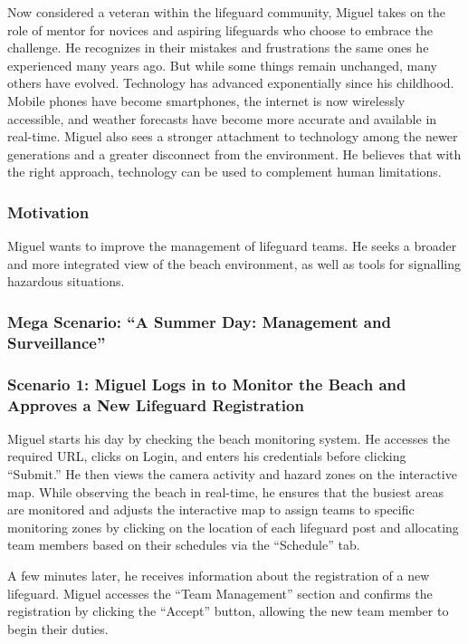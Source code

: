 Now considered a veteran within the lifeguard community, Miguel takes on the role of mentor for novices and aspiring lifeguards who choose to embrace the challenge. He recognizes in their mistakes and frustrations the same ones he experienced many years ago. But while some things remain unchanged, many others have evolved. Technology has advanced exponentially since his childhood. Mobile phones have become smartphones, the internet is now wirelessly accessible, and weather forecasts have become more accurate and available in real-time. Miguel also sees a stronger attachment to technology among the newer generations and a greater disconnect from the environment. He believes that with the right approach, technology can be used to complement human limitations.

\subsubsection{\textbf{Motivation}}
Miguel wants to improve the management of lifeguard teams. He seeks a broader and more integrated view of the beach environment, as well as tools for signalling hazardous situations.
\subsubsection{\textbf{Mega Scenario: ``A Summer Day: Management and Surveillance''}}
\subsubsection{\textbf{Scenario 1:} Miguel Logs in to Monitor the Beach and Approves a New Lifeguard Registration}
Miguel starts his day by checking the beach monitoring system. He accesses the required URL, clicks on Login, and enters his credentials before clicking ``Submit.'' He then views the camera activity and hazard zones on the interactive map. While observing the beach in real-time, he ensures that the busiest areas are monitored and adjusts the interactive map to assign teams to specific monitoring zones by clicking on the location of each lifeguard post and allocating team members based on their schedules via the ``Schedule'' tab. 

A few minutes later, he receives information about the registration of a new lifeguard. Miguel accesses the ``Team Management'' section and confirms the registration by clicking the ``Accept'' button, allowing the new team member to begin their duties.

